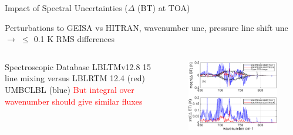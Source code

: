 \documentclass[10pt,t]{beamer}
\begin{document}
\begin{frame}{Impact of Spectral Uncertainties ($\Delta$ (BT) at TOA)}

\begin{block}{Perturbations to}
GEISA vs HITRAN, wavenumber unc, pressure line shift unc \newline $\rightarrow$ $\le$ 0.1 K RMS differences
\end{block}

\vspace{-0.1in}
\begin{columns}

\begin{column}{0.55\columnwidth}
\begin{block}{Spectroscopic Database}
LBLTMv12.8 15 \um \cd line mixing versus \newline
LBLRTM 12.4 (red) UMBCLBL (blue) \newline
\textcolor{red}{But integral over wavenumber should give similar fluxes}
\end{block}
\end{column}

\begin{column}{0.55\columnwidth}
\begin{figure}
\begin{center}
\includegraphics[width=1.005\textwidth]{NEWFIGS/co2_linemix_flavorsV2.pdf}
\end{center}
\end{figure}
\end{column}
\end{columns}
\end{frame}
\end{document}
